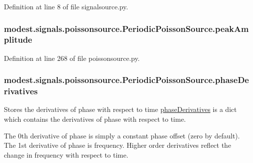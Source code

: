 Definition at line 8 of file signalsource.\+py.

\subsubsection[{\texorpdfstring{peak\+Amplitude}{peakAmplitude}}]{\setlength{\rightskip}{0pt plus 5cm}modest.\+signals.\+poissonsource.\+Periodic\+Poisson\+Source.\+peak\+Amplitude}\hypertarget{classmodest_1_1signals_1_1poissonsource_1_1PeriodicPoissonSource_a2616e8654edeac61b5616c6bc7333138}{}\label{classmodest_1_1signals_1_1poissonsource_1_1PeriodicPoissonSource_a2616e8654edeac61b5616c6bc7333138}


Definition at line 268 of file poissonsource.\+py.

\subsubsection[{\texorpdfstring{phase\+Derivatives}{phaseDerivatives}}]{\setlength{\rightskip}{0pt plus 5cm}modest.\+signals.\+poissonsource.\+Periodic\+Poisson\+Source.\+phase\+Derivatives}\hypertarget{classmodest_1_1signals_1_1poissonsource_1_1PeriodicPoissonSource_ae30b60a8e1f92e1172041cd1fd267df8}{}\label{classmodest_1_1signals_1_1poissonsource_1_1PeriodicPoissonSource_ae30b60a8e1f92e1172041cd1fd267df8}


Stores the derivatives of phase with respect to time  \hyperlink{classmodest_1_1signals_1_1poissonsource_1_1PeriodicPoissonSource_ae30b60a8e1f92e1172041cd1fd267df8}{phase\+Derivatives} is a dict which contains the derivatives of phase with respect to time. 

The 0th derivative of phase is simply a constant phase offset (zero by default). The 1st derivative of phase is frequency. Higher order derivatives reflect the change in frequency with respect to time.


